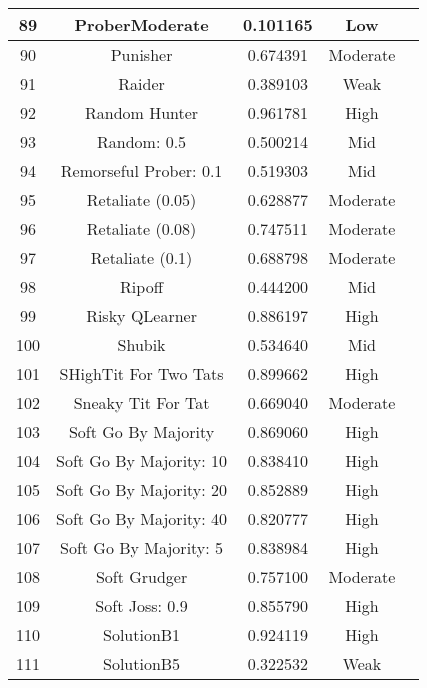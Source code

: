 \begin{longtable}{ccccc}
			89  & ProberModerate              & 0.101165          & Low      \\ \hline
			90  & Punisher                    & 0.674391          & Moderate \\ \hline
			91  & Raider                      & 0.389103          & Weak     \\ \hline
			92  & Random Hunter               & 0.961781          & High     \\ \hline
			93  & Random: 0.5                 & 0.500214          & Mid     \\ \hline
			94  & Remorseful Prober: 0.1      & 0.519303          & Mid     \\ \hline
			95  & Retaliate (0.05)            & 0.628877          & Moderate \\ \hline
			96  & Retaliate (0.08)            & 0.747511          & Moderate \\ \hline
			97  & Retaliate (0.1)             & 0.688798          & Moderate \\ \hline
			98  & Ripoff                      & 0.444200          & Mid     \\ \hline
			99  & Risky QLearner              & 0.886197          & High     \\ \hline
			100 & Shubik                      & 0.534640          & Mid     \\ \hline
			101 & SHighTit For Two Tats       & 0.899662          & High     \\ \hline
			102 & Sneaky Tit For Tat          & 0.669040          & Moderate \\ \hline
			103 & Soft Go By Majority         & 0.869060          & High     \\ \hline
			104 & Soft Go By Majority: 10     & 0.838410          & High     \\ \hline
			105 & Soft Go By Majority: 20     & 0.852889          & High     \\ \hline
			106 & Soft Go By Majority: 40     & 0.820777          & High     \\ \hline
			107 & Soft Go By Majority: 5      & 0.838984          & High     \\ \hline
			108 & Soft Grudger                & 0.757100          & Moderate \\ \hline
			109 & Soft Joss: 0.9              & 0.855790          & High     \\ \hline
			110 & SolutionB1                  & 0.924119          & High     \\ \hline
			111 & SolutionB5                  & 0.322532          & Weak     \\ \hline

\end{longtable}
